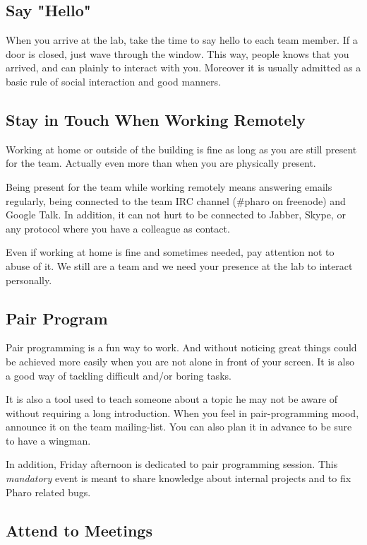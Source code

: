 \documentclass[10pt]{article}
\begin{document}
\subsection{Say "Hello"}
When you arrive at the lab, take the time to say hello to each team member. If a door is closed, just wave through the window. This way, people knows that you arrived, and can plainly to interact with you. Moreover it is usually admitted as a basic rule of social interaction and good manners.

\subsection{Stay in Touch When Working Remotely}

Working at home or outside of the building is fine as long as you are still present for the team. Actually even more than when you are physically present.

Being present for the team while working remotely means answering emails regularly, being connected to the team IRC channel (\#pharo on freenode) and Google Talk. In addition, it can not hurt to be connected to Jabber, Skype, or any protocol where you have a colleague as contact.

Even if working at home is fine and sometimes needed, pay attention not to abuse of it. We still are a team and we need your presence at the lab to interact personally.

\subsection{Pair Program}

Pair programming is a fun way to work. And without noticing great things could be achieved more easily when you are not alone in front of your screen. It is also a good way of tackling difficult and/or boring tasks.

It is also a tool used to teach someone about a topic he may not be aware of without requiring a long introduction. When you feel in pair-programming mood, announce it on the team mailing-list. You can also plan it in advance to be sure to have a wingman.

In addition, Friday afternoon is dedicated to pair programming session. This \emph{mandatory} event is meant to share knowledge about internal projects and to fix Pharo related bugs.

\subsection{Attend to Meetings}
\end{document}
